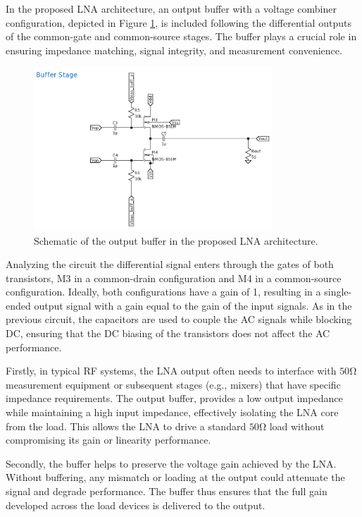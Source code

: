 In the proposed LNA architecture, an output buffer with a voltage combiner configuration, depicted in Figure \ref{fig:schem-buffer}, is included following the differential outputs of the common-gate and common-source stages. The buffer plays a crucial role in ensuring impedance matching, signal integrity, and measurement convenience.

\begin{figure}[H]
    \centering
    \includegraphics[width=0.8\textwidth]{Images/schem-Buffer.png}
    \caption{Schematic of the output buffer in the proposed LNA architecture.}
    \label{fig:schem-buffer}
\end{figure}

Analyzing the circuit the differential signal enters through the gates of both transistors, M3 in a common-drain configuration and M4 in a common-source configuration. Ideally, both configurations have a gain of 1, resulting in a single-ended output signal with a gain equal to the gain of the input signals. As in the previous circuit, the capacitors are used to couple the AC signals while blocking DC, ensuring that the DC biasing of the transistors does not affect the AC performance.

Firstly, in typical RF systems, the LNA output often needs to interface with $50 \si{\ohm}$ measurement equipment or subsequent stages (e.g., mixers) that have specific impedance requirements. The output buffer, provides a low output impedance while maintaining a high input impedance, effectively isolating the LNA core from the load. This allows the LNA to drive a standard $50 \si{\ohm}$ load without compromising its gain or linearity performance.

Secondly, the buffer helps to preserve the voltage gain achieved by the LNA. Without buffering, any mismatch or loading at the output could attenuate the signal and degrade performance. The buffer thus ensures that the full gain developed across the load devices is delivered to the output.

